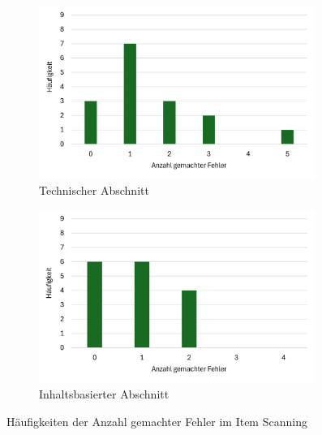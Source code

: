 \begin{figure}[tbh]
    \centering
    \begin{subfigure}{.5\textwidth}
        \centering
        \includegraphics[width=0.99\textwidth]{images/Results/Histogramm-Anzahl-Fehler-technisch-item.png}
        \caption{Technischer Abschnitt}
        \label{fig:anzahlFehlerItemTechnisch}
    \end{subfigure}%
    \begin{subfigure}{.5\textwidth}
        \centering
        \includegraphics[width=0.99\textwidth]{images/Results/Histogramm-Anzahl-Fehler-inhalt-item.png}
        \caption{Inhaltsbasierter Abschnitt}
        \label{fig:anzahlFehlerItemInhalt}
   \end{subfigure}
   \caption{Häufigkeiten der Anzahl gemachter Fehler im Item Scanning}
   \label{fig:anzahlFehlerItem}
\end{figure}
\

